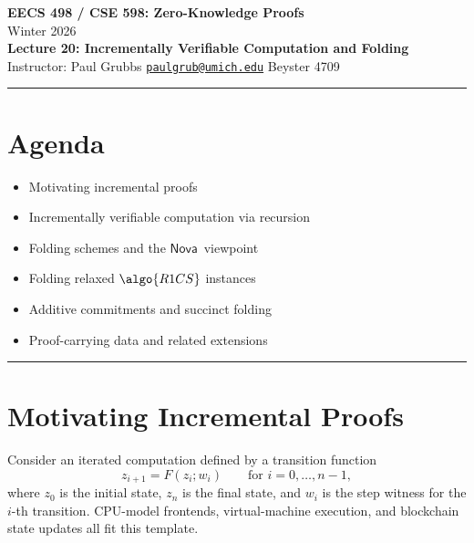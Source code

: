\documentclass[11pt]{article}
\newcommand{\Nova}{\ensuremath{\mathsf{Nova}}}
\begin{document}
\begin{center}
  {\LARGE \textbf{EECS 498 / CSE 598: Zero-Knowledge Proofs}}\\[6pt]
  {\large Winter 2026}\\[4pt]
  {\large \textbf{Lecture 20: Incrementally Verifiable Computation and Folding}}\\[4pt]
  {\large Instructor: Paul Grubbs \quad
    \href{mailto:paulgrub@umich.edu}{\texttt{paulgrub@umich.edu}} \quad
    Beyster 4709}
\end{center}

\vspace{0.5em}
\hrule
\vspace{1em}

\section*{Agenda}
\begin{itemize}
  \item Motivating incremental proofs
  \item Incrementally verifiable computation via recursion
  \item Folding schemes and the \Nova\ viewpoint
  \item Folding relaxed $\algo{R1CS}$ instances
  \item Additive commitments and succinct folding
  \item Proof-carrying data and related extensions
\end{itemize}

\hrule
\vspace{1em}

\section{Motivating Incremental Proofs}

Consider an iterated computation defined by a transition function
\[
  z_{i+1} = F(z_i; w_i)
  \qquad\text{for } i=0,\ldots,n-1,
\]
where $z_0$ is the initial state, $z_n$ is the final state, and $w_i$ is the
step witness for the $i$-th transition.  CPU-model frontends, virtual-machine
execution, and blockchain state updates all fit this template.
\end{document}
